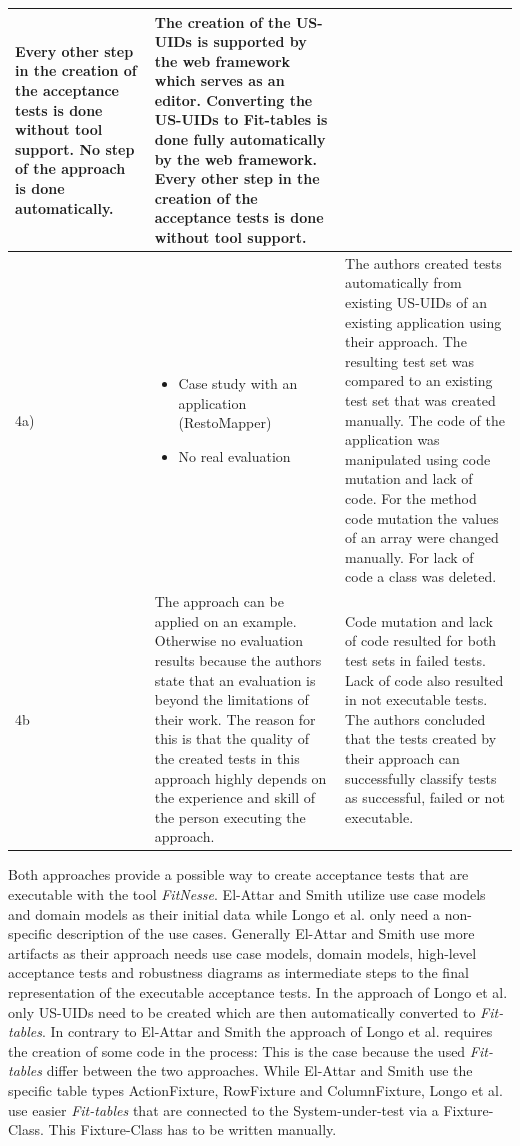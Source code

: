 \begin{small}
\begin{longtable}[h]{p{0.45cm}|p{}|p{}}
Every other step in the creation of the acceptance tests is done without tool support.
No step of the approach is done automatically.
 & The creation of the US-UIDs is supported by the web framework which serves as an editor.
Converting the US-UIDs to Fit-tables is done fully automatically by the web framework.
Every other step in the creation of the acceptance tests is done without tool support.
 \\
  \hline
  4a) & 
  	\begin{itemize} 
  		\item Case study with an application (RestoMapper)
		\item	No real evaluation 
	\end{itemize}
 & The authors created tests automatically from existing US-UIDs of an existing application using their approach.
The resulting test set was compared to an existing test set that was created manually.
The code of the application was manipulated using code mutation and lack of code.
For the method code mutation the values of an array were changed manually. For lack of code a class was deleted.
 \\
  \hline
  		 4b & The approach can be applied on an example.
Otherwise no evaluation results because the authors state that an evaluation is beyond the limitations of their work.
The reason for this is that the quality of the created tests in this approach highly depends on the experience and skill of the person executing the approach.
 & Code mutation and lack of code resulted for both test sets in failed tests.
Lack of code also resulted in not executable tests.
The authors concluded that the tests created by their approach can successfully classify tests as successful, failed or not executable.
 \\
  \hline
\end{longtable}
\end{small}

Both approaches provide a possible way to create acceptance tests that are executable with the tool \textit{FitNesse}.
El-Attar and Smith utilize use case models and domain models as their initial data while Longo et al. only need a non-specific description of the use cases.
Generally El-Attar and Smith use more artifacts as their approach needs use case models, domain models, high-level acceptance tests and robustness diagrams as intermediate steps to the final representation of the executable acceptance tests.
In the approach of Longo et al. only US-UIDs need to be created which are then automatically converted to \textit{Fit-tables}.
In contrary to El-Attar and Smith the approach of Longo et al. requires the creation of some code in the process:
This is the case because the used \textit{Fit-tables} differ between the two approaches.
While El-Attar and Smith use the specific table types ActionFixture, RowFixture and ColumnFixture, Longo et al. use easier \textit{Fit-tables} that are connected to the System-under-test via a Fixture-Class.
This Fixture-Class has to be written manually.

